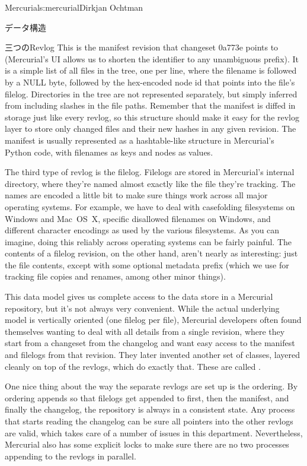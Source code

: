 \begin{aosachapter}{Mercurial}{s:mercurial}{Dirkjan Ochtman}
\begin{aosasect1}{データ構造}
\begin{aosasect2}{三つのRevlog}
\noindent This is the manifest revision that changeset 0a773e points to
(Mercurial's UI allows us to shorten the identifier to any unambiguous
prefix). It is a simple list of all files in the tree, one per line,
where the filename is followed by a NULL byte, followed by the
hex-encoded node id that points into the file's filelog. Directories
in the tree are not represented separately, but simply inferred from
including slashes in the file paths. Remember that the manifest is
diffed in storage just like every revlog, so this structure should
make it easy for the revlog layer to store only changed files and
their new hashes in any given revision. The manifest is usually
represented as a hashtable-like structure in Mercurial's Python code,
with filenames as keys and nodes as values.

The third type of revlog is the filelog. Filelogs are stored in Mercurial's internal  directory,
where they're named almost exactly like the file they're tracking. The
names are encoded a little bit to make sure things work across all
major operating systems. For example, we have to deal with casefolding
filesystems on Windows and Mac~OS~X, specific disallowed filenames on
Windows, and different character encodings as used by the various
filesystems. As you can imagine, doing this reliably across operating
systems can be fairly painful. The contents of a filelog revision, on
the other hand, aren't nearly as interesting: just the file contents,
except with some optional metadata prefix (which we use for tracking
file copies and renames, among other minor things).

This data model gives us complete access to the data store in a
Mercurial repository, but it's not always very convenient. While the
actual underlying model is vertically oriented (one filelog per file),
Mercurial developers often found themselves wanting to deal with all
details from a single revision, where they start from a changeset from
the changelog and want easy access to the manifest and filelogs from
that revision.  They later invented another set of classes, layered
cleanly on top of the revlogs, which do exactly that. These are
called .

One nice thing about the way the separate revlogs are set up is the
ordering. By ordering appends so that filelogs get appended to first,
then the manifest, and finally the changelog, the repository is always
in a consistent state. Any process that starts reading the changelog
can be sure all pointers into the other revlogs are valid, which takes
care of a number of issues in this department. Nevertheless, Mercurial
also has some explicit locks to make sure there are no two processes
appending to the revlogs in parallel.


\end{aosasect2}
\end{aosasect1}
\end{aosachapter}
